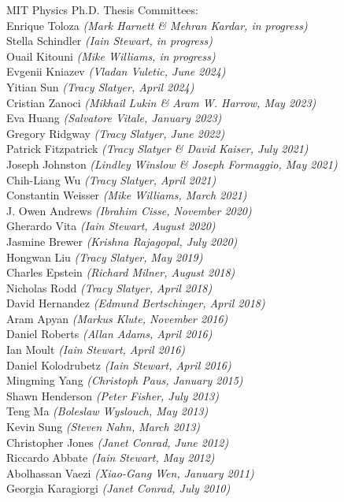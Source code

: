\bbl

\item MIT Physics Ph.D. Thesis Committees:
\\ Enrique Toloza \textit{(Mark Harnett \& Mehran Kardar, in progress)}
\\ Stella Schindler \textit{(Iain Stewart, in progress)}
\\ Ouail Kitouni \textit{(Mike Williams, in progress)}
\\ Evgenii Kniazev \textit{(Vladan Vuletic, June 2024)}
\\ Yitian Sun \textit{(Tracy Slatyer, April 2024)}
\\ Cristian Zanoci \textit{(Mikhail Lukin \& Aram W. Harrow, May 2023)}
\\ Eva Huang \textit{(Salvatore Vitale, January 2023)}
\\ Gregory Ridgway \textit{(Tracy Slatyer, June 2022)}
\\ Patrick Fitzpatrick \textit{(Tracy Slatyer \& David Kaiser, July 2021)}
\\ Joseph Johnston \textit{(Lindley Winslow \& Joseph Formaggio, May 2021)}
\\ Chih-Liang Wu \textit{(Tracy Slatyer, April 2021)}
\\ Constantin Weisser \textit{(Mike Williams, March 2021)}
\\ J. Owen Andrews \textit{(Ibrahim Cisse, November 2020)}
\\ Gherardo Vita \textit{(Iain Stewart, August 2020)}
\\ Jasmine Brewer \textit{(Krishna Rajagopal, July 2020)}
\\ Hongwan Liu \textit{(Tracy Slatyer, May 2019)}
\\ Charles Epstein \textit{(Richard Milner, August 2018)}
\\ Nicholas Rodd \textit{(Tracy Slatyer, April 2018)}
\\ David Hernandez \textit{(Edmund Bertschinger, April 2018)}
\\ Aram Apyan \textit{(Markus Klute, November 2016)}
\\ Daniel Roberts \textit{(Allan Adams, April 2016)}
\\ Ian Moult \textit{(Iain Stewart, April 2016)}
\\ Daniel Kolodrubetz \textit{(Iain Stewart, April 2016)}
\\ Mingming Yang \textit{(Christoph Paus, January 2015)}
\\ Shawn Henderson \textit{(Peter Fisher, July 2013)}
\\ Teng Ma \textit{(Boleslaw Wyslouch, May 2013)}
\\ Kevin Sung \textit{(Steven Nahn, March 2013)}
\\ Christopher Jones \textit{(Janet Conrad, June 2012)}
\\ Riccardo Abbate \textit{(Iain Stewart, May 2012)}
\\ Abolhassan Vaezi \textit{(Xiao-Gang Wen, January 2011)}
\\ Georgia Karagiorgi \textit{(Janet Conrad, July 2010)}


